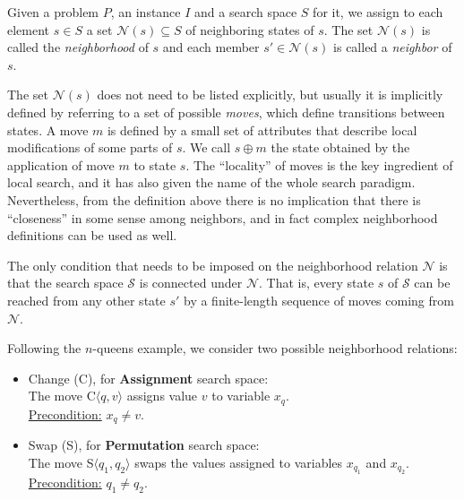 Given a problem $P$, an instance $I$ and a search space $S$ for it, we
assign to each element $s\in S$ a set $\mathcal{N}(s) \subseteq S$ of
neighboring states of $s$. The set $\mathcal{N}(s)$ is called the
\emph{neighborhood} of $s$ and each member $s'\in \mathcal{N}(s)$ is
called a \emph{neighbor} of $s$.

The set $\mathcal{N}(s)$ does not need to be listed explicitly, but usually
it is implicitly defined by referring to a set of possible
\emph{moves}, which define transitions between states. A move $m$
is defined by a small set of attributes that describe local
modifications of some parts of $s$. We call $s \oplus m$ the state
obtained by the application of move $m$ to state $s$. The ``locality''
of moves is the key ingredient of local search, and it has
also given the name of the whole search paradigm. Nevertheless, from
the definition above there is no implication that there is
``closeness'' in some sense among neighbors, and in fact complex
neighborhood definitions can be used as well.

The only condition that needs to be imposed on the neighborhood relation
$\mathcal{N}$ is that the search space $\mathcal{S}$ is connected
under $\mathcal{N}$. That is, every state $s$ of $\mathcal{S}$ can be
reached from any other state $s'$ by a finite-length sequence of moves
coming from $\mathcal{N}$.

Following the $n$-queens example, we consider two possible
neighborhood relations:

\begin{itemize}\itemsep 2mm
\item \textsf{Change} (\textsf{C}), for \textbf{Assignment} search space:\\
  The move \textsf{C}$\langle q,v\rangle$ assigns value $v$ to variable $x_q$.\\
  \underline{Precondition:} $x_q \neq v$.\\
  
\item \textsf{Swap} (\textsf{S}), for \textbf{Permutation} search space:\\
The move \textsf{S}$\langle q_1,q_2\rangle$ swaps the  values assigned to variables $x_{q_1}$ and $x_{q_2}$.\\
\underline{Precondition:} $q_1\neq q_2$.\\
\end{itemize}

